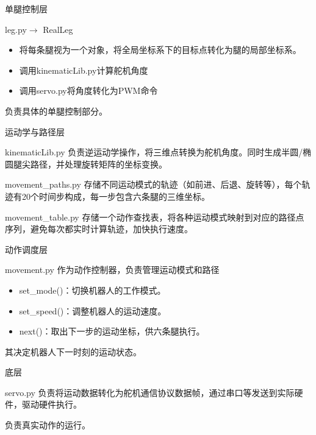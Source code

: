 \documentclass{beamer}
\begin{document}
\begin{frame}{单腿控制层}
    \begin{exampleblock}{leg.py$\rightarrow$ RealLeg}
        \begin{itemize}
            \item 将每条腿视为一个对象，将全局坐标系下的目标点转化为腿的局部坐标系。
            \item 调用kinematicLib.py计算舵机角度
            \item 调用servo.py将角度转化为PWM命令
        \end{itemize}
        负责具体的单腿控制部分。
    \end{exampleblock}
\end{frame}

\begin{frame}{运动学与路径层}
    \begin{exampleblock}{kinematicLib.py}
        负责逆运动学操作，将三维点转换为舵机角度。同时生成半圆/椭圆腿尖路径，并处理旋转矩阵的坐标变换。
    \end{exampleblock}
    \begin{exampleblock}{movement\_paths.py}
        存储不同运动模式的轨迹（如前进、后退、旋转等），每个轨迹有20个时间步构成，每一步包含六条腿的三维坐标。
    \end{exampleblock}
    \begin{exampleblock}{movement\_table.py}
        存储一个动作查找表，将各种运动模式映射到对应的路径点序列，避免每次都实时计算轨迹，加快执行速度。
    \end{exampleblock}
\end{frame}

\begin{frame}{动作调度层}
    \begin{exampleblock}{movement.py}
        作为动作控制器，负责管理运动模式和路径
        \begin{itemize}
            \item set\_mode()：切换机器人的工作模式。
            \item set\_speed()：调整机器人的运动速度。
            \item next()：取出下一步的运动坐标，供六条腿执行。
        \end{itemize}
        其决定机器人下一时刻的运动状态。
    \end{exampleblock}
\end{frame}

\begin{frame}{底层}
    \begin{exampleblock}{servo.py}
        负责将运动数据转化为舵机通信协议数据帧，通过串口等发送到实际硬件，驱动硬件执行。

        负责真实动作的运行。
    \end{exampleblock}
\end{frame}
\end{document}
